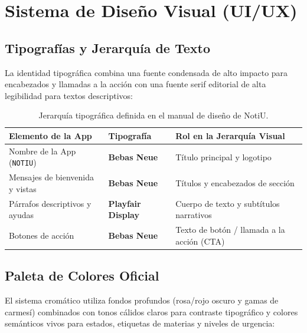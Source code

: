\documentclass[11pt,letterpaper]{article}
\begin{document}
\section{Sistema de Diseño Visual (UI/UX)}

\subsection{Tipografías y Jerarquía de Texto}
La identidad tipográfica combina una fuente condensada de alto impacto para encabezados y llamadas a la acción con una fuente serif editorial de alta legibilidad para textos descriptivos:

\begin{table}[h!]
  \centering
  \renewcommand{\arraystretch}{1.2}
  \begin{tabularx}{\textwidth}{l l X}
    \toprule
    \textbf{Elemento de la App} & \textbf{Tipografía} & \textbf{Rol en la Jerarquía Visual} \\
    \midrule
    Nombre de la App (\texttt{NOTIU}) & \textbf{Bebas Neue} & Título principal y logotipo \\
    Mensajes de bienvenida y vistas & \textbf{Bebas Neue} & Títulos y encabezados de sección \\
    Párrafos descriptivos y ayudas & \textbf{Playfair Display} & Cuerpo de texto y subtítulos narrativos \\
    Botones de acción & \textbf{Bebas Neue} & Texto de botón / llamada a la acción (CTA) \\
    \bottomrule
  \end{tabularx}
  \caption{Jerarquía tipográfica definida en el manual de diseño de NotiU.}
\end{table}

\subsection{Paleta de Colores Oficial}
El sistema cromático utiliza fondos profundos (rosa/rojo oscuro y gamas de carmesí) combinados con tonos cálidos claros para contraste tipográfico y colores semánticos vivos para estados, etiquetas de materias y niveles de urgencia:
\end{document}
